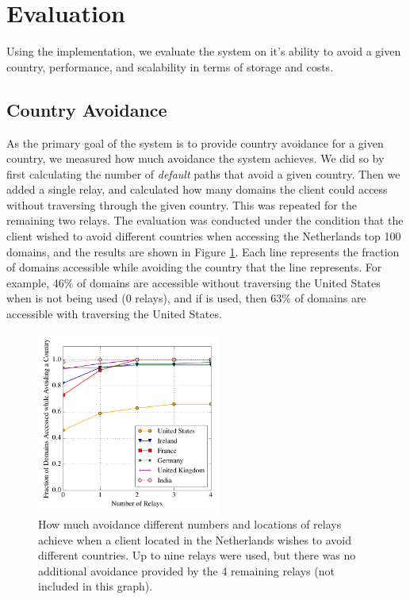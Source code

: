 \section{Evaluation}
Using the \system{} implementation, we evaluate the system on it's ability to avoid a given country, performance, and scalability in terms of storage and costs.

\subsection{Country Avoidance}
As the primary goal of the system is to provide country avoidance for a given 
country, we measured how much avoidance the system achieves.  We did so by first 
calculating the number of {\it default} paths that avoid a given country.  Then 
we added a single relay, and calculated how many domains the client could 
access without traversing through the given country.  This was repeated for 
the remaining two relays.  The evaluation was conducted under the condition that 
the client wished to avoid different countries when accessing the Netherlands top 
100 domains, and the results are shown in Figure \ref{fig:avoidance_eval}.  Each 
line represents the fraction of domains accessible while avoiding the country that 
the line represents.  For example, 46\% of domains are accessible without traversing 
the United States when \system{} is not being used (0 relays), and if \system{} is 
used, then 63\% of domains are accessible with traversing the United States.

\begin{figure}[b!]
\tiny
\centering
\includegraphics[width=.5\textwidth,height=6cm]{avoidance_n_relays}
\caption{How much avoidance different numbers and locations of relays achieve when a 
client located in the Netherlands wishes to avoid different countries.  Up to nine 
relays were used, but there was no additional avoidance provided by the 4 remaining 
relays (not included in this graph).}
\label{fig:avoidance_eval}
\end{figure}

